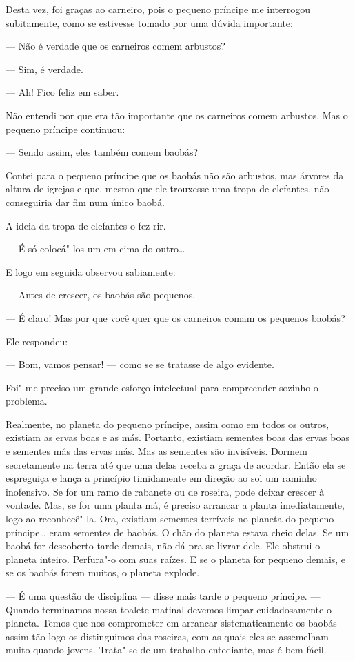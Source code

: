 \begin{Parallel}[p]{}{}
{Desta vez, foi graças ao carneiro, pois o pequeno príncipe me interrogou
subitamente, como se estivesse tomado por uma dúvida importante:

--- Não é verdade que os carneiros comem arbustos?

--- Sim, é verdade.

--- Ah! Fico feliz em saber.

Não entendi por que era tão importante que os carneiros comem arbustos.
Mas o pequeno príncipe continuou:

--- Sendo assim, eles também comem baobás?

Contei para o pequeno príncipe que os baobás não são arbustos, mas
árvores da altura de igrejas e que, mesmo que ele trouxesse uma tropa de
elefantes, não conseguiria dar fim num único baobá.

A ideia da tropa de elefantes o fez rir.

--- É só colocá"-los um em cima do outro\ldots{}

E logo em seguida observou sabiamente:

--- Antes de crescer, os baobás são pequenos.

--- É claro! Mas por que você quer que os carneiros comam os pequenos
baobás?

Ele respondeu:

--- Bom, vamos pensar! --- como se se tratasse de algo evidente.

Foi"-me preciso um grande esforço intelectual para compreender sozinho o
problema.

Realmente, no planeta do pequeno príncipe, assim como em todos os
outros, existiam as ervas boas e as más. Portanto, existiam sementes
boas das ervas boas e sementes más das ervas más. Mas as sementes são
invisíveis. Dormem secretamente na terra até que uma delas receba a
graça de acordar. Então ela se espreguiça e lança a princípio
timidamente em direção ao sol um raminho inofensivo. Se for um ramo de
rabanete ou de roseira, pode deixar crescer à vontade. Mas, se for uma
planta má, é preciso arrancar a planta imediatamente, logo ao
reconhecê"-la. Ora, existiam sementes terríveis no planeta do pequeno
príncipe\ldots{} eram sementes de baobás. O chão do planeta estava cheio
delas. Se um baobá for descoberto tarde demais, não dá pra se livrar
dele. Ele obstrui o planeta inteiro. Perfura"-o com suas raízes. E se o
planeta for pequeno demais, e se os baobás forem muitos, o planeta
explode.

--- É uma questão de disciplina --- disse mais tarde o pequeno príncipe. ---
Quando terminamos nossa toalete matinal devemos limpar cuidadosamente o
planeta. Temos que nos comprometer em arrancar sistematicamente os
baobás assim tão logo os distinguimos das roseiras, com as quais eles se
assemelham muito quando jovens. Trata"-se de um trabalho entediante, mas
é bem fácil.

}
\end{Parallel}

